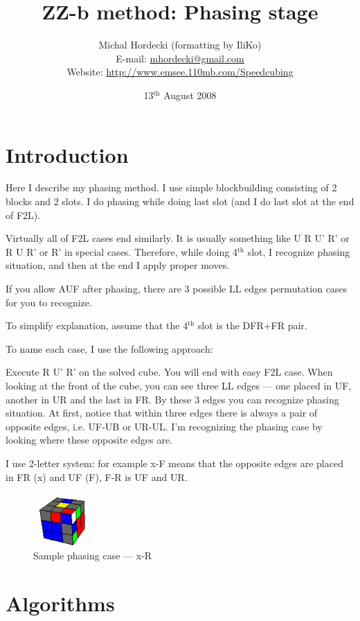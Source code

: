 \documentclass[a4paper]{article}
\title{\textbf{ZZ-b method: Phasing stage}}
\author{Michal Hordecki \small (formatting by IliKo) \\
E-mail: \url{mhordecki@gmail.com} \\
Website: \href{https://web.archive.org/web/20090903194420/http://www.emsee.110mb.com/Speedcubing/ZZ\%20speedcubing\%20system.html}{http://www.emsee.110mb.com/Speedcubing}}
\date{13$^\text{th}$ August 2008}
\begin{document}
\maketitle
\thispagestyle{empty}

\section*{Introduction}

Here I describe my phasing method. I use simple blockbuilding consisting of 2 blocks and 2 slots. I do phasing while doing last slot (and I do last slot at the end of F2L).

\smallskip
Virtually all of F2L cases end similarly. It is usually something like U R U' R' or R U R' or R' in special cases. Therefore, while doing 4$^\text{th}$ slot, I recognize phasing situation, and then at the end I apply proper moves.

\smallskip
If you allow AUF after phasing, there are 3 possible LL edges permutation cases for you to recognize.

To simplify explanation, assume that the 4$^\text{th}$ slot is the DFR+FR pair.

\smallskip
To name each case, I use the following approach:

Execute R U' R' on the solved cube. You will end with easy F2L case. When looking at the front of the cube, you can see three LL edges --- one placed in UF, another in UR and the last in FR. By these 3 edges you can recognize phasing situation. At first, notice that within three edges there is always a pair of opposite edges, i.e. UF-UB or UR-UL. I'm recognizing the phasing case by looking where these opposite edges are.

\smallskip
I use 2-letter system: for example x-F means that the opposite edges are placed in FR (x) and UF (F), F-R is UF and UR.

\begin{figure}[htb!]
\centering
\includegraphics[height=2cm]{Example.png}
\caption{Sample phasing case --- x-R}
\end{figure}

\vfill
\section*{Algorithms}
\vspace{-10pt}
\end{document}
